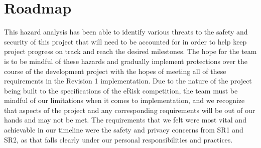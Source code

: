 \documentclass{article}
\begin{document}
\section{Roadmap}


This hazard analysis has been able to identify various threats to the safety and security of this project that will need to be accounted for in order to help keep project progress on track and reach the desired milestones. The hope for the team is to be mindful of these hazards and gradually implement protections over the course of the development project with the hopes of meeting all of these requirements in the Revision 1 implementation. Due to the nature of the project being built to the specifications of the eRisk competition, the team must be mindful of our limitations when it comes to implementation, and we recognize that aspects of the project and any corresponding requirements will be out of our hands and may not be met. The requirements that we felt were most vital and achievable in our timeline were the safety and privacy concerns from SR1 and SR2, as that falls clearly under our personal responsibilities and practices.
\end{document}
